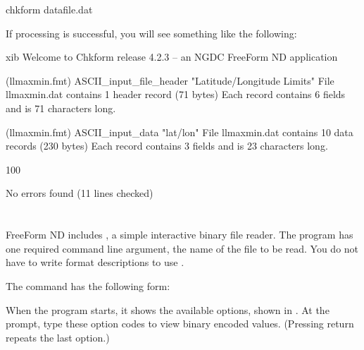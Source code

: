 \begin{example}
chkform datafile.dat
\end{example}

If processing is successful, you will see something like the
following: 

\begin{vcode}{xib}
Welcome to Chkform release 4.2.3 -- an NGDC FreeForm ND application


(llmaxmin.fmt) ASCII_input_file_header  "Latitude/Longitude Limits"
File llmaxmin.dat contains 1 header record (71 bytes)
Each record contains 6 fields and is 71 characters long.

(llmaxmin.fmt) ASCII_input_data "lat/lon"
File llmaxmin.dat contains 10 data records (230 bytes)
Each record contains 3 fields and is 23 characters long.

100%

No errors found (11 lines checked)
\end{vcode}







\section{}
\label{ff,readfile}

FreeForm ND includes , a simple interactive binary file
reader. The program has one required command line argument, the name
of the file to be read. You do not have to write format descriptions
to use .

The  command has the following form:     


When the program starts, it shows the available options, shown in
. At the  prompt, type
these option codes to view binary encoded values. (Pressing return
repeats the last option.)

